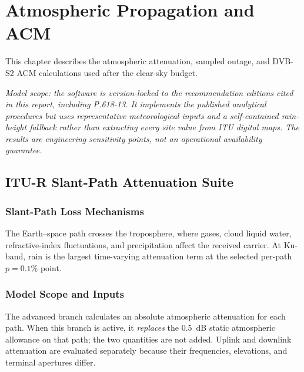 
\section{Atmospheric Propagation and ACM}

\vspace{0.3cm}

This chapter describes the atmospheric attenuation, sampled outage, and DVB-S2 ACM calculations used after the clear-sky budget.

\textit{Model scope: the software is version-locked to the recommendation editions cited in this report, including P.618-13. It implements the published analytical procedures but uses representative meteorological inputs and a self-contained rain-height fallback rather than extracting every site value from ITU digital maps. The results are engineering sensitivity points, not an operational availability guarantee.}

\subsection[ITU-R Slant-Path Attenuation Suite]{ITU-R Slant-Path Attenuation Suite}

\subsubsection{Slant-Path Loss Mechanisms}
The Earth--space path crosses the troposphere, where gases, cloud liquid water, refractive-index fluctuations, and precipitation affect the received carrier. At Ku-band, rain is the largest time-varying attenuation term at the selected per-path $p=0.1\%$ point.

\subsubsection{Model Scope and Inputs}
The advanced branch calculates an absolute atmospheric attenuation for each path. When this branch is active, it \emph{replaces} the 0.5~dB static atmospheric allowance on that path; the two quantities are not added. Uplink and downlink attenuation are evaluated separately because their frequencies, elevations, and terminal apertures differ.

